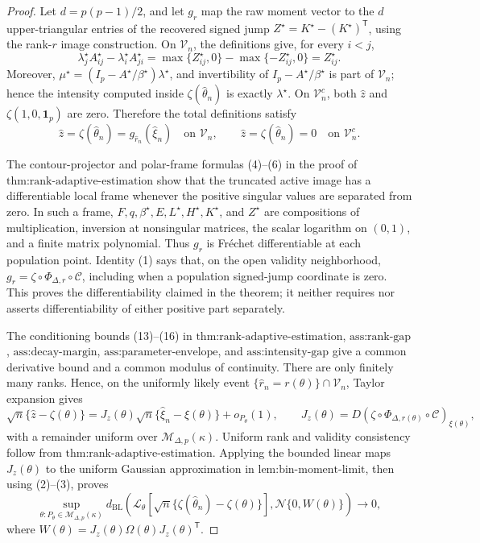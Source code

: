 \documentclass{article}
\begin{document}
\begin{proof}
Let \(d=p(p-1)/2\), and let \(g_r\) map the raw moment vector to the \(d\) upper-triangular entries of the recovered signed jump \(Z^\star=K^\star-(K^\star)^{\mathsf T}\), using the rank-\(r\) image construction.  On \(\mathcal V_n\), the definitions give, for every \(i<j\),
\[
 \lambda_j^\star A_{ij}^\star-\lambda_i^\star A_{ji}^\star
 =\max\{Z_{ij}^\star,0\}-\max\{-Z_{ij}^\star,0\}
 =Z_{ij}^\star.
\tag{1}
\]
Moreover, \(\mu^\star=(I_p-A^\star/\beta^\star)\lambda^\star\), and invertibility of \(I_p-A^\star/\beta^\star\) is part of \(\mathcal V_n\); hence the intensity computed inside \(\zeta(\widehat\theta_n)\) is exactly \(\lambda^\star\).  On \(\mathcal V_n^c\), both \(\widehat z\) and \(\zeta(1,0,\mathbf1_p)\) are zero.  Therefore the total definitions satisfy
\[
 \widehat z=\zeta(\widehat\theta_n)
 =g_{\widehat r_n}(\widehat\xi_n)\quad\text{on }\mathcal V_n,
 \qquad
 \widehat z=\zeta(\widehat\theta_n)=0\quad\text{on }\mathcal V_n^c.
\tag{2}
\]

The contour-projector and polar-frame formulas (4)--(6) in the proof of \(\text{thm:rank-adaptive-estimation}\) show that the truncated active image has a differentiable local frame whenever the positive singular values are separated from zero.  In such a frame, \(F,q,\beta^\star,E,L^\star,H^\star,K^\star\), and \(Z^\star\) are compositions of multiplication, inversion at nonsingular matrices, the scalar logarithm on \((0,1)\), and a finite matrix polynomial.  Thus \(g_r\) is Fr\'{e}chet differentiable at each population point.  Identity (1) says that, on the open validity neighborhood, \(g_r=\zeta\circ\Phi_{\Delta,r}\circ\mathcal C\), including when a population signed-jump coordinate is zero.  This proves the differentiability claimed in the theorem; it neither requires nor asserts differentiability of either positive part separately.

The conditioning bounds (13)--(16) in \(\text{thm:rank-adaptive-estimation}\), \(\text{ass:rank-gap}\), \(\text{ass:decay-margin}\), \(\text{ass:parameter-envelope}\), and \(\text{ass:intensity-gap}\) give a common derivative bound and a common modulus of continuity.  There are only finitely many ranks.  Hence, on the uniformly likely event \(\{\widehat r_n=r(\theta)\}\cap\mathcal V_n\), Taylor expansion gives
\[
 \sqrt n\{\widehat z-\zeta(\theta)\}
 =J_z(\theta)\sqrt n\{\widehat\xi_n-\xi(\theta)\}+o_{P_\theta}(1),
 \qquad
 J_z(\theta)=D(\zeta\circ\Phi_{\Delta,r(\theta)}\circ\mathcal C)_{\xi(\theta)},
\tag{3}
\]
with a remainder uniform over \(\mathcal M_{\Delta,p}(\kappa)\).  Uniform rank and validity consistency follow from \(\text{thm:rank-adaptive-estimation}\).  Applying the bounded linear maps \(J_z(\theta)\) to the uniform Gaussian approximation in \(\text{lem:bin-moment-limit}\), then using (2)--(3), proves
\[
 \sup_{\theta:P_\theta\in\mathcal M_{\Delta,p}(\kappa)}
 d_{\mathrm{BL}}\!\left(
 \mathcal L_\theta[\sqrt n\{\zeta(\widehat\theta_n)-\zeta(\theta)\}],
 \mathcal N\{0,W(\theta)\}\right)\longrightarrow0,
\tag{4}
\]
where \(W(\theta)=J_z(\theta)\Omega(\theta)J_z(\theta)^{\mathsf T}\).


\end{proof}
\end{document}
